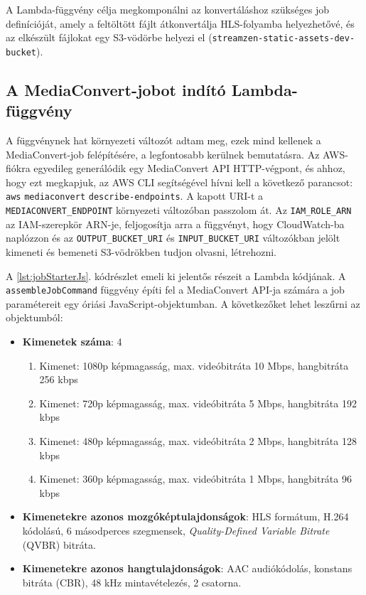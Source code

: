 A Lambda-függvény célja megkomponálni az konvertáláshoz szükséges job definícióját, amely a feltöltött fájlt átkonvertálja HLS-folyamba helyezhetővé, és az elkészült fájlokat egy S3-vödörbe helyezi el (\verb|streamzen-static-assets-dev-bucket|).

\subsection{A MediaConvert-jobot indító Lambda-függvény}

A függvénynek hat környezeti változót adtam meg, ezek mind kellenek a MediaConvert-job felépítésére, a legfontosabb kerülnek bemutatásra. Az AWS-fiókra egyedileg generálódik egy MediaConvert API HTTP-végpont, és ahhoz, hogy ezt megkapjuk, az AWS CLI segítségével hívni kell a következő parancsot: \verb|aws| \verb|mediaconvert| \verb|describe-endpoints|. A kapott URI-t a \verb|MEDIACONVERT_ENDPOINT| környezeti változóban passzolom át. Az \verb|IAM_ROLE_ARN| az IAM-szerepkör ARN-je, feljogosítja arra a függvényt, hogy CloudWatch-ba naplózzon és az \verb|OUTPUT_BUCKET_URI| és \verb|INPUT_BUCKET_URI| változókban jelölt kimeneti és bemeneti S3-vödrökben tudjon olvasni, létrehozni.

A \ref{lst:jobStarterJs}. kódrészlet emeli ki jelentős részeit a Lambda kódjának. A \verb|assembleJobCommand| függvény építi fel a MediaConvert API-ja számára a job paramétereit egy óriási JavaScript-objektumban. A következőket lehet leszűrni az objektumból:

\begin{itemize}
  \setlength{\itemsep}{1pt}
  \setlength{\parskip}{0pt}
  \setlength{\parsep}{0pt}
  \item \textbf{Kimenetek száma}: 4
        \begin{enumerate}
          \setlength{\itemsep}{1pt}
          \setlength{\parskip}{0pt}
          \setlength{\parsep}{0pt}
          \item Kimenet: 1080p képmagasság, max. videóbitráta 10 Mbps, hangbitráta 256 kbps
          \item Kimenet: 720p képmagasság, max. videóbitráta 5 Mbps, hangbitráta 192 kbps
          \item Kimenet: 480p képmagasság, max. videóbitráta 2 Mbps, hangbitráta 128 kbps
          \item Kimenet: 360p képmagasság, max. videóbitráta 1 Mbps, hangbitráta 96 kbps
        \end{enumerate}
  \item \textbf{Kimenetekre azonos mozgóképtulajdonságok}: HLS formátum, H.264 kódolású, 6 másodperces szegmensek, \emph{Quality-Defined Variable Bitrate} (QVBR) bitráta\cite{qvbr}.
  \item \textbf{Kimenetekre azonos hangtulajdonságok}: AAC audiókódolás, konstans bitráta (CBR), 48 kHz mintavételezés, 2 csatorna.
\end{itemize}

